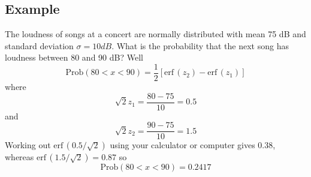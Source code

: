 \documentclass[11pt,a4paper]{scrartcl}
\begin{document}
\subsection*{Example}

The loudness of songs at a concert are normally distributed with mean 75 dB and standard deviation $\sigma=10 dB$. What is the probability that the next song has loudness between 80 and 90 dB? Well
\begin{equation}
\mbox{Prob}(80<x<90)=\frac{1}{2}[\mbox{erf}\,(z_2)-\mbox{erf}\,(z_1)]
\end{equation}
where 
\begin{equation}
\sqrt{2}z_1=\frac{80-75}{10}=0.5
\end{equation}
and 
\begin{equation}
\sqrt{2}z_2=\frac{90-75}{10}=1.5
\end{equation}
Working out $\mbox{erf}\,(0.5/\sqrt{2})$ using your calculator or computer gives 0.38, whereas $\mbox{erf}\,(1.5/\sqrt{2})=0.87$ so
\begin{equation}
\mbox{Prob}(80<x<90)=0.2417
\end{equation}
\end{document}
